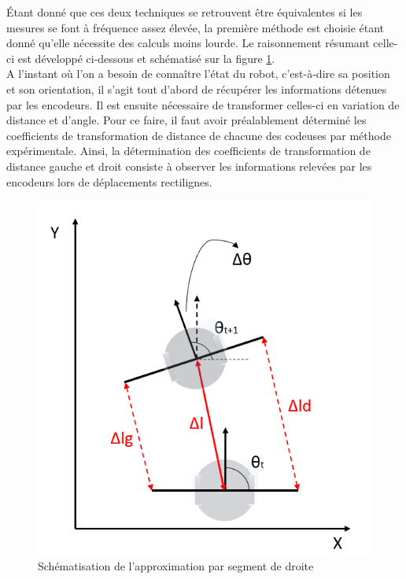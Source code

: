 \documentclass[a4paper,11pt]{article}
\begin{document}
Étant donné que ces deux techniques se retrouvent être équivalentes si les mesures se font à fréquence assez élevée, la première méthode est choisie étant donné qu'elle nécessite des calculs moins lourde.\cite{noauthor_robotics:odometrie_2014} Le raisonnement résumant celle-ci est développé ci-dessous et schématisé sur la figure \ref{fig:approx}.\\

A l'instant où l'on a besoin de connaître l'état du robot, c'est-à-dire sa position et son orientation, il s'agit tout d'abord de récupérer les informations détenues par les encodeurs. Il est ensuite nécessaire de transformer celles-ci en variation de distance et d'angle. Pour ce faire, il faut avoir préalablement déterminé les coefficients de transformation de distance de chacune des codeuses par méthode expérimentale.\cite{guyot_[tutoriel]_2016} Ainsi, la détermination des coefficients de transformation de distance gauche et droit consiste à observer les informations relevées par les encodeurs lors de déplacements rectilignes.\\
\begin{figure}[H]
    \centering
    \includegraphics[scale = 1]{approxsegment.PNG}
    \caption{Schématisation de l'approximation par segment de droite}
    \label{fig:approx}
\end{figure}
\end{document}
